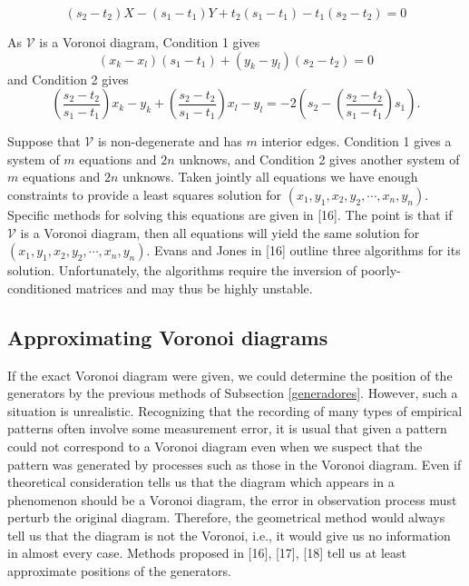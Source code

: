 \documentclass[a4paper,12pt]{article}
\newtheorem*{Condition 1}{Condition 1}
\newtheorem*{Condition 2}{Condition 2}
\theoremstyle{definition}
\theoremstyle{remark}
\begin{document}
$$(s_2-t_2)X-(s_1-t_1)Y+t_2(s_1-t_1)-t_1(s_2-t_2)=0$$ 

\noindent As $\mathcal{V}$ is a Voronoi diagram, Condition 1 gives
\begin{equation*} \label{cond1}
 (x_k-x_l)(s_1-t_1)+(y_k-y_l)(s_2-t_2)=0
\end{equation*}
and Condition 2 gives
\begin{equation*} \label{cond2}
(\dfrac{s_2-t_2}{s_1-t_1})x_k-y_k+(\dfrac{s_2-t_2}{s_1-t_1})x_l-y_l=-2\left( s_2-(\dfrac{s_2-t_2}{s_1-t_1})s_1\right).
\end{equation*}

Suppose that $\mathcal{V}$ is non-degenerate and has $m$ interior edges. Condition 1 gives a system of $m$ equations and $2n$ unknows, and Condition 2 gives another system of $m$ equations and $2n$ unknows. Taken jointly all equations we have enough constraints to provide a least squares solution for $(x_1,y_1,x_2,y_2,\cdots,x_n,y_n)$. Specific methods for solving this equations are given in [16]. The point is that if $\mathcal{V}$ is a Voronoi diagram, then all equations will yield the same solution for $(x_1,y_1,x_2,y_2,\cdots,x_n,y_n)$. Evans and Jones in [16] outline three algorithms for its solution. Unfortunately, the algorithms require the inversion of
poorly-conditioned matrices and may thus be highly unstable.


\subsection{Approximating Voronoi diagrams}

If the exact Voronoi diagram were given, we could determine the position of the generators by the previous methods of Subsection \ref{generadores}. However, such a situation is unrealistic. Recognizing that the recording of many types of empirical patterns often involve some measurement error, it is usual that given a pattern could not correspond to a Voronoi diagram even when we suspect that the pattern was generated by processes such as those in the Voronoi diagram. Even if theoretical consideration tells us that the diagram which appears in a phenomenon should be a Voronoi diagram, the error in observation process must perturb the original diagram. Therefore, the geometrical method would always tell us that the diagram is not the Voronoi, i.e., it would give us no information in almost every case. Methods proposed in [16], [17], [18]  tell us at least approximate positions of the generators.
\end{document}
